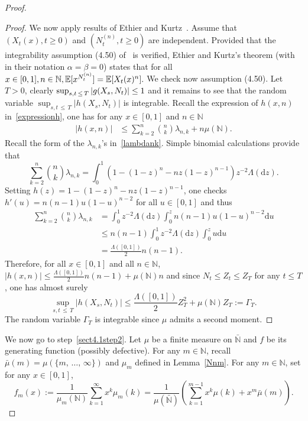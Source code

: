 \documentclass[10pt]{amsart}
\theoremstyle{definition}\newtheorem{defi}[theo]{Definition}\newtheorem{rema}[theo]{Remark}\newtheorem{exam}[theo]{Example}\newtheorem{exem}[theo]{Example}\newtheorem{nota}[theo]{Notation}
\newcommand{\ddr}{\mathrm{d}}
\newcommand{\bbN}{\mathbb{N}}
\newcommand{\bbE}{\mathbb{E}}
\begin{document}
\begin{proof}
\begin{proof}
We now apply results of Ethier and Kurtz~\cite[Theorem~4.4.11, p.~192]{EthierKurtz}. Assume that $(X_t(x),t\geq 0)$ and $(N_t^{(n)},t\geq 0)$ are independent. Provided that the integrability assumption (4.50) of~\cite[Theorem~4.4.11]{EthierKurtz} is verified, Ethier and Kurtz's theorem (with in their notation $\alpha=\beta=0$) states that for all 
$
x\in [0,1], n\in \bbN, \bbE[x^{N_{t}^{(n)}}]\linebreak=\bbE[X_{t}(x)^{n}].
$
We check now assumption (4.50). Let $T>0$, clearly $\sup_{s,t\,\leq\,T}|g(X_{s},N_{t})|\linebreak\leq 1$ and it remains to see that the random variable $\sup_{s,t\,\leq\,T}|h(X_{s},N_{t})|$ is integrable. Recall the expression of $h(x,n)$ in~\eqref{expressionh}, one has for any $x\in[0,1]$ and $n\in \bbN$
\begin{align*}\label{integralform}
|h(x,n)|&\leq \sum_{k=2}^{n}\binom{n}{k}\lambda_{n,k}+n\mu(\bbN). 
\end{align*}
Recall the form of the $\lambda_{n,k}$'s in~\eqref{lambdank}. Simple binomial calculations provide that
\[
\sum_{k=2}^{n}\binom{n}{k}\lambda_{n,k}=\int_{0}^{1}\left(1-(1-z)^n-nz(1-z)^{n-1}\right)z^{-2}\Lambda(\ddr z).
\]
Setting $h(z)=1-(1-z)^n-nz(1-z)^{n-1}$, one checks $h'(u)=n(n-1)u(1-u)^{n-2}$ for all $u\in [0,1]$ and thus
\begin{align*}
\sum_{k=2}^{n}\binom{n}{k}\lambda_{n,k}&=\int_{0}^{1}z^{-2}\Lambda(\ddr z)\int_{0}^{z}n(n-1)u(1-u)^{n-2}\ddr u\\
&\leq n(n-1)\int_{0}^{1}z^{-2}\Lambda(\ddr z)\int_{0}^{z}u\ddr u\\
&=\frac{\Lambda([0,1])}{2}n(n-1).
\end{align*}
Therefore, for all $x\in [0,1]$ and all $n\in \bbN$, $|h(x,n)|\leq \frac{\Lambda([0,1])}{2}n(n-1)+\mu(\bbN)n$ and since $N_t\leq Z_t\leq Z_T$ for any $t\leq T$, one has almost surely
\[
\sup_{s,t\,\leq\,T}|h(X_{s},N_{t})|\leq \frac{\Lambda([0,1])}{2}Z_T^2+\mu(\bbN)Z_T:=\Gamma_T.
\]
The random variable $\Gamma_T$ is integrable since $\mu$ admits a second moment.
\end{proof}

We now go to step~\eqref{sect4.1step2}. Let $\mu$ be a finite measure on $\bar{\bbN}$ and $f$ be its generating function (possibly defective). For any $m\in \bbN$, recall $\bar{\mu}(m)=\mu(\{m,\,\ldots,\, \infty\})$ and $\mu_m$ defined in Lemma~\ref{Nnm}. For any $m\in \bbN$, set for any $x\in [0,1]$,
\begin{equation}\label{fm}
f_m(x):=\frac{1}{\mu_m(\bbN)}\sum_{k=1}^{\infty}x^{k}\mu_{m}(k)=\frac{1}{\mu(\bar{\bbN})}\left(\sum_{k=1}^{m-1}x^{k}\mu(k)+x^{m}\bar{\mu}(m)\right).
\end{equation}


\end{proof}
\end{document}
